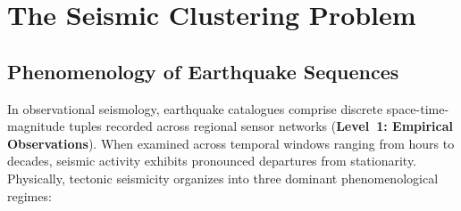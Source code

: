 \section{The Seismic Clustering Problem}
\label{sec:seismic_clustering_problem}

\subsection{Phenomenology of Earthquake Sequences}
\label{subsec:seismic_phenomenology}

In observational seismology, earthquake catalogues comprise discrete
space-time-magnitude tuples recorded across regional sensor networks
(\textbf{Level~1: Empirical Observations}). When examined across
temporal windows ranging from hours to decades, seismic activity
exhibits pronounced departures from stationarity. Physically,
tectonic seismicity organizes into three dominant phenomenological regimes:

